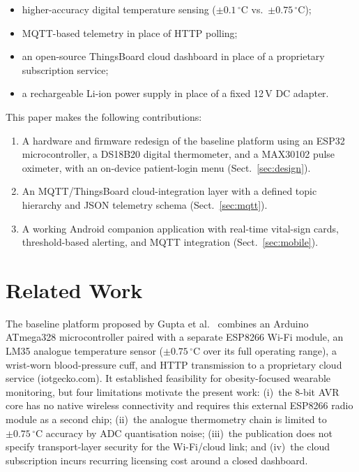 \documentclass[pdflatex,sn-mathphys-num]{sn-jnl}
\begin{document}
\begin{itemize}
  \item higher-accuracy digital temperature sensing
    ($\pm0.1\,^\circ$C vs.\ $\pm0.75\,^\circ$C);
  \item MQTT-based telemetry in place of HTTP polling;
  \item an open-source ThingsBoard cloud dashboard in place of a
    proprietary subscription service;
  \item a rechargeable Li-ion power supply in place of a fixed
    12\,V DC adapter.
\end{itemize}

This paper makes the following contributions:
\begin{enumerate}
  \item A hardware and firmware redesign of the baseline platform
    using an ESP32 microcontroller, a DS18B20 digital thermometer,
    and a MAX30102 pulse oximeter, with an on-device
    patient-login menu (Sect.~\ref{sec:design}).
  \item An MQTT/ThingsBoard cloud-integration layer with a defined
    topic hierarchy and JSON telemetry schema
    (Sect.~\ref{sec:mqtt}).
  \item A working Android companion application with real-time
    vital-sign cards, threshold-based alerting, and MQTT integration
    (Sect.~\ref{sec:mobile}).
\end{enumerate}

\section{Related Work}\label{sec:related}

The baseline platform proposed by Gupta et al.~\cite{gupta2020}
combines an Arduino ATmega328 microcontroller paired with a separate
ESP8266 Wi-Fi module, an LM35 analogue temperature sensor
($\pm0.75\,^\circ$C over its full operating range), a wrist-worn
blood-pressure cuff, and HTTP transmission to a proprietary cloud
service (iotgecko.com). It established feasibility for
obesity-focused wearable monitoring, but four limitations motivate
the present work: (i)~the 8-bit AVR core has no native wireless
connectivity and requires this external ESP8266 radio module as a
second chip; (ii)~the analogue thermometry chain is limited to
$\pm0.75\,^\circ$C
accuracy by ADC quantisation noise; (iii)~the publication does not
specify transport-layer security for the Wi-Fi/cloud link; and
(iv)~the cloud subscription incurs recurring licensing cost around a
closed dashboard.
\end{document}
